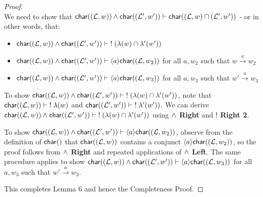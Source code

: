 \begin{proof}
\[\]
We need to show that $ \mathsf{char}((\mathcal{L},w)) \land  \mathsf{char}((\mathcal{L}',w')) \vdash  \mathsf{char}((\mathcal{L},w) \sqcap (\mathcal{L}',w'))$ - or in other words, that:
\begin{itemize}
\item
$ \mathsf{char}((\mathcal{L},w)) \land  \mathsf{char}((\mathcal{L}',w')) \vdash \; ! \; (\lambda(w) \cap \lambda'(w'))$
\item
$ \mathsf{char}((\mathcal{L},w)) \land  \mathsf{char}((\mathcal{L}',w')) \vdash \langle a \rangle  \mathsf{char}((\mathcal{L}, w_2))$ for all $a,w_2$ such that $w \xrightarrow{a} w_2$
\item
$ \mathsf{char}((\mathcal{L},w)) \land  \mathsf{char}((\mathcal{L}',w')) \vdash \langle a \rangle  \mathsf{char}((\mathcal{L}, w_3))$ for all $a,w_3$ such that $w' \xrightarrow{a} w_3$
\end{itemize}
To show $ \mathsf{char}((\mathcal{L},w)) \land  \mathsf{char}((\mathcal{L}',w')) \vdash \; ! \; (\lambda(w) \cap \lambda'(w'))$, note that $ \mathsf{char}((\mathcal{L},w))  \vdash \; ! \; \lambda(w)$ and $ \mathsf{char}((\mathcal{L}',w')) \vdash \; ! \;  \lambda'(w'))$.
We can derive $ \mathsf{char}((\mathcal{L},w)) \land  \mathsf{char}((\mathcal{L}',w')) \vdash \; ! \; (\lambda(w) \cap \lambda'(w'))$ using {\bf $\land$ Right} and {\bf $!$ Right 2}. 

To show $ \mathsf{char}((\mathcal{L},w)) \land  \mathsf{char}((\mathcal{L}',w')) \vdash \langle a \rangle  \mathsf{char}((\mathcal{L}, w_2))$, observe from the definition of $ \CHAR$ that $ \mathsf{char}((\mathcal{L},w))$ contains a conjunct $\langle a \rangle  \mathsf{char}((\mathcal{L}, w_2))$, so the proof follows from  {\bf $\land$ Right} and repeated applications of  {\bf $\land$ Left}. The same procedure applies to show $ \mathsf{char}((\mathcal{L},w)) \land  \mathsf{char}((\mathcal{L}',w')) \vdash \langle a \rangle  \mathsf{char}((\mathcal{L}, w_3))$ for all $a,w_3$ such that $w' \xrightarrow{a} w_3$.

This completes Lemma 6 and hence the Completeness Proof.


\end{proof}
